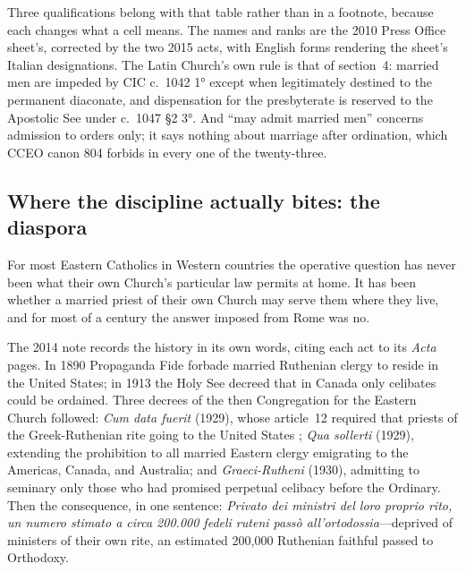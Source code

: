 Three qualifications belong with that table rather than in a footnote, because each changes what a cell means. The names and ranks are the 2010 Press Office sheet's, corrected by the two 2015 acts, with English forms rendering the sheet's Italian designations. The Latin Church's own rule is that of section~4: married men are impeded by CIC c.~1042 1° except when legitimately destined to the permanent diaconate, and dispensation for the presbyterate is reserved to the Apostolic See under c.~1047 §2 3°. And ``may admit married men'' concerns admission to orders only; it says nothing about marriage after ordination, which CCEO canon 804 forbids in every one of the twenty-three.

\subsection{Where the discipline actually bites: the diaspora}

For most Eastern Catholics in Western countries the operative question has never been what their own Church's particular law permits at home. It has been whether a married priest of their own Church may serve them where they live, and for most of a century the answer imposed from Rome was no.

The 2014 note records the history in its own words, citing each act to its \emph{Acta} pages. In 1890 Propaganda Fide forbade married Ruthenian clergy to reside in the United States; in 1913 the Holy See decreed that in Canada only celibates could be ordained. Three decrees of the then Congregation for the Eastern Church followed: \emph{Cum data fuerit} (1929), whose article~12 required that priests of the Greek-Ruthenian rite going to the United States ; \emph{Qua sollerti} (1929), extending the prohibition to all married Eastern clergy emigrating to the Americas, Canada, and Australia; and \emph{Graeci-Rutheni} (1930), admitting to seminary only those who had promised perpetual celibacy before the Ordinary. Then the consequence, in one sentence: \emph{Privato dei ministri del loro proprio rito, un numero stimato a circa 200.000 fedeli ruteni passò all'ortodossia}---deprived of ministers of their own rite, an estimated 200,000 Ruthenian faithful passed to Orthodoxy.

